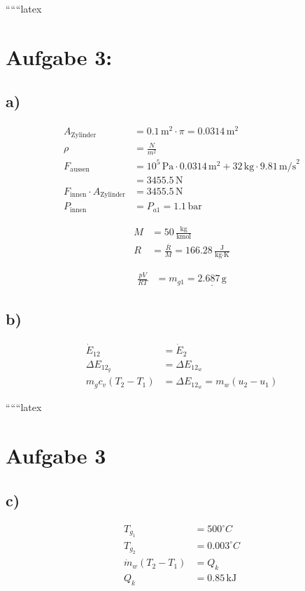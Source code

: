
``````latex


\section*{Aufgabe 3:}

\subsection*{a)}

\begin{align*}
A_{\text{Zylinder}} &= 0.1\,\text{m}^2 \cdot \pi = 0.0314\,\text{m}^2 \\
\rho &= \frac{N}{m^2} \\
F_{\text{aussen}} &= 10^5\,\text{Pa} \cdot 0.0314\,\text{m}^2 + 32\,\text{kg} \cdot 9.81\,\text{m/s}^2 \\
&= 3455.5\,\text{N} \\
F_{\text{innen}} \cdot A_{\text{Zylinder}} &= 3455.5\,\text{N} \\
P_{\text{innen}} &= P_{a1} = 1.1\,\text{bar}
\end{align*}

\begin{align*}
M &= 50\,\frac{\text{kg}}{\text{kmol}} \\
R &= \frac{\bar{R}}{M} = 166.28\,\frac{\text{J}}{\text{kg} \cdot \text{K}}
\end{align*}

\begin{align*}
\frac{pV}{RT} &= m_{g1} = \underline{2.687\,\text{g}}
\end{align*}

\subsection*{b)}

\begin{align*}
\dot{E}_{12} &= \dot{E}_2 \\
\Delta E_{12_g} &= \Delta E_{12_w} \\
m_g c_v (T_2 - T_1) &= \Delta E_{12_w} = m_w (u_2 - u_1)
\end{align*}

``````latex


\section*{Aufgabe 3}

\subsection*{c)}
\begin{align*}
    T_{g_1} &= 500^\circ C \\
    T_{g_2} &= 0.003^\circ C \\
    \dot{m}_w (T_{2} - T_{1}) &= Q_k \\
    Q_k &= 0.85 \, \text{kJ}
\end{align*}

